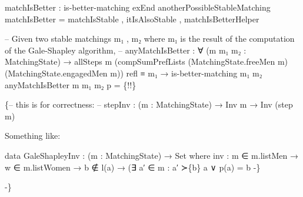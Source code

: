 \documentclass{article}
\begin{document}
\begin{code}
{matchIsBetter : is-better-matching exEnd anotherPossibleStableMatching
matchIsBetter = matchIsStable , itIsAlsoStable , matchIsBetterHelper

-- Given two stable matchings m₁ , m₂ where m₁ is the result of the computation of the Gale-Shapley algorithm,
-- 
anyMatchIsBetter : ∀ (m m₁ m₂ : MatchingState) → allSteps m (compSumPrefLists (MatchingState.freeMen m) (MatchingState.engagedMen m)) refl ≡ m₁ →
                     is-better-matching m₁ m₂
anyMatchIsBetter m m₁ m₂ p = \{!!\}

\{-- this is for correctness:
-- stepInv : (m : MatchingState) → Inv m → Inv (step m)

Something like:

data GaleShapleyInv : (m : MatchingState) → Set where
  inv : m ∈ m.listMen → w ∈ m.listWomen → b ∉ l(a) → (∃ a′ ∈ m : a′ ≻\AgdaUnderscore{}\{b\} a ∨ p(a) = b
-\}

-\}}\<%
\\
%
\\[\AgdaEmptyExtraSkip]%
\>[0]\AgdaSpace{}%
\AgdaSymbol{:}\AgdaSpace{}%
\AgdaSymbol{(}\AgdaSpace{}%
\AgdaSymbol{:}\AgdaSpace{}%
\AgdaSymbol{)}\AgdaSpace{}%
\AgdaSpace{}%
\AgdaSpace{}%
\AgdaOperator{\AgdaPrimitive{+}}\AgdaSpace{}%
\AgdaSpace{}%
\AgdaSpace{}%
\<%
\\
\>[0]\AgdaSpace{}%
\AgdaSpace{}%
\AgdaSymbol{=}\AgdaSpace{}%
\<%
\\
%
\\[\AgdaEmptyExtraSkip]%
\>[0]\AgdaSpace{}%
\AgdaSymbol{:}\AgdaSpace{}%
\AgdaSymbol{(}\AgdaSpace{}%
\AgdaSymbol{:}\AgdaSpace{}%
\AgdaSymbol{)}\AgdaSpace{}%
\AgdaSpace{}%
\AgdaSpace{}%
\AgdaOperator{\AgdaPrimitive{+}}\AgdaSpace{}%
\AgdaSpace{}%
\AgdaSpace{}%
\<%
\\
\>[0]\AgdaSpace{}%
\AgdaSpace{}%
\AgdaSymbol{=}\AgdaSpace{}%
\<%
\\
\>[0]\AgdaSpace{}%
\AgdaSymbol{(}\AgdaSpace{}%
\AgdaSymbol{)}\AgdaSpace{}%
\AgdaSymbol{=}\AgdaSpace{}%
\AgdaSpace{}%
\AgdaSpace{}%
\AgdaSymbol{(}\AgdaSpace{}%
\AgdaSymbol{)}\<%
\\
\>[0]\<%
\end{code}
\end{document}
